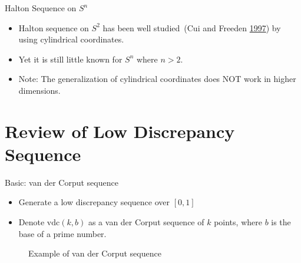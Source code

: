\documentclass[10pt,ignorenonframetext,serif,onlymath]{beamer}
\begin{document}
\begin{frame}{Halton Sequence on \(S^n\)}
\protect\hypertarget{halton-sequence-on-sn}{}

\begin{itemize}
\item
  Halton sequence on \(S^2\) has been well studied~(Cui and Freeden
  \protect\hyperlink{ref-cui1997equidistribution}{1997}) by using
  cylindrical coordinates.
\item
  Yet it is still little known for \(S^n\) where \(n>2\).
\item
  Note: The generalization of cylindrical coordinates does NOT work in
  higher dimensions.
\end{itemize}

\end{frame}

\hypertarget{review-of-low-discrepancy-sequence}{%
\section{Review of Low Discrepancy
Sequence}\label{review-of-low-discrepancy-sequence}}

\begin{frame}{Basic: van der Corput sequence}
\protect\hypertarget{basic-van-der-corput-sequence}{}

\begin{itemize}
\item
  Generate a low discrepancy sequence over \([0,1]\)
\item
  Denote \(\mathrm{vdc}(k,b)\) as a van der Corput sequence of \(k\)
  points, where \(b\) is the base of a prime number.
\end{itemize}

\begin{figure}[hp]
\centering

\caption{Example of van der Corput sequence}%
\label{fig:vdc}
\end{figure}

\end{frame}
\end{document}
